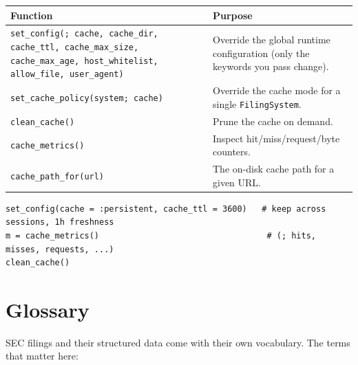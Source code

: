 \documentclass[11pt,a4paper]{report}
\begin{document}
\begin{longtable}{@{}p{}p{}@{}}
\toprule
\textbf{Function} & \textbf{Purpose} \\
\midrule
\endhead
\texttt{set\_config(; cache, cache\_dir, cache\_ttl, cache\_max\_size, cache\_max\_age, host\_whitelist,
  allow\_file, user\_agent)} & Override the global runtime configuration (only the keywords you pass
  change). \\
\texttt{set\_cache\_policy(system; cache)} & Override the cache mode for a single \texttt{FilingSystem}. \\
\texttt{clean\_cache()} & Prune the cache on demand. \\
\texttt{cache\_metrics()} & Inspect hit/miss/request/byte counters. \\
\texttt{cache\_path\_for(url)} & The on-disk cache path for a given URL. \\
\bottomrule
\end{longtable}

\begin{lstlisting}
set_config(cache = :persistent, cache_ttl = 3600)   # keep across sessions, 1h freshness
m = cache_metrics()                                  # (; hits, misses, requests, ...)
clean_cache()
\end{lstlisting}




\appendix

\chapter{Glossary}
\label{sec:glossary}

SEC filings and their structured data come with their own vocabulary.
The terms that matter here:
\end{document}
